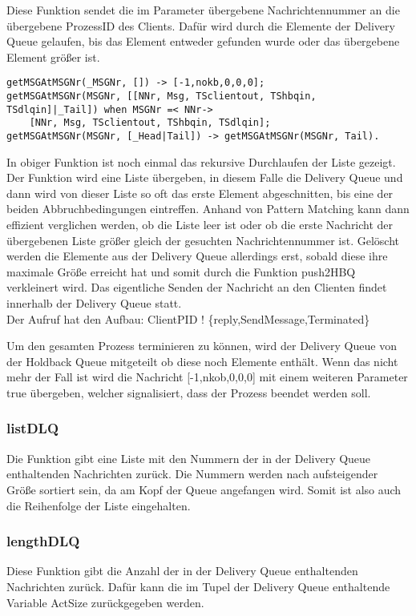 Diese Funktion sendet die im Parameter übergebene Nachrichtennummer an die übergebene ProzessID des Clients. Dafür wird durch die Elemente der Delivery Queue gelaufen, bis das Element entweder gefunden wurde oder das übergebene Element größer ist. 

\begin{lstlisting}
getMSGAtMSGNr(_MSGNr, []) -> [-1,nokb,0,0,0];
getMSGAtMSGNr(MSGNr, [[NNr, Msg, TSclientout, TShbqin, TSdlqin]|_Tail]) when MSGNr =< NNr-> 
    [NNr, Msg, TSclientout, TShbqin, TSdlqin];
getMSGAtMSGNr(MSGNr, [_Head|Tail]) -> getMSGAtMSGNr(MSGNr, Tail).
\end{lstlisting}

In obiger Funktion ist noch einmal das rekursive Durchlaufen der Liste gezeigt. Der Funktion wird eine Liste übergeben, in diesem Falle die Delivery Queue und dann wird von dieser Liste so oft das erste Element abgeschnitten, bis eine der beiden Abbruchbedingungen eintreffen. Anhand von Pattern Matching kann dann effizient verglichen werden, ob die Liste leer ist oder ob die erste Nachricht der übergebenen Liste größer gleich der gesuchten Nachrichtennummer ist.
Gelöscht werden die Elemente aus der Delivery Queue allerdings erst, sobald diese ihre maximale Größe erreicht hat und somit durch die Funktion push2HBQ verkleinert wird. 
Das eigentliche Senden der Nachricht an den Clienten findet innerhalb der Delivery Queue statt. \\Der Aufruf hat den Aufbau:
ClientPID ! \{reply,SendMessage,Terminated\}

Um den gesamten Prozess terminieren zu können, wird der Delivery Queue von der Holdback Queue mitgeteilt ob diese noch Elemente enthält. Wenn das nicht mehr der Fall ist wird die Nachricht [-1,nkob,0,0,0] mit einem weiteren Parameter true übergeben, welcher signalisiert, dass der Prozess beendet werden soll. 

\subsubsection{listDLQ}

Die Funktion gibt eine Liste mit den Nummern der in der Delivery Queue enthaltenden Nachrichten zurück. Die Nummern werden nach aufsteigender Größe sortiert sein, da am Kopf der Queue angefangen wird. Somit ist also auch die Reihenfolge der Liste eingehalten. 

\subsubsection{lengthDLQ}

Diese Funktion gibt die Anzahl der in der Delivery Queue enthaltenden Nachrichten zurück. Dafür kann die im Tupel der Delivery Queue enthaltende Variable ActSize zurückgegeben werden. 